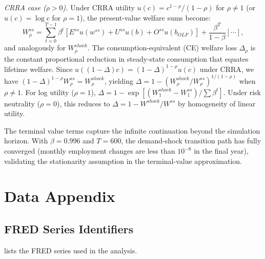 \documentclass[12pt]{article}
\begin{document}
\textit{CRRA case ($\rho > 0$).} Under CRRA utility $u(c) = c^{1-\rho}/(1-\rho)$ for $\rho \neq 1$ (or $u(c) = \log c$ for $\rho = 1$), the present-value welfare sums become:
\begin{equation*}
W^{ss}_\rho = \sum_{t=0}^{T-1} \beta^t \left[ E^{ss} u(w^{ss}) + U^{ss} u(b) + O^{ss} u(b_{OLF}) \right] + \frac{\beta^T}{1-\beta}[\cdots],
\end{equation*}
and analogously for $W^{shock}_\rho$. The consumption-equivalent (CE) welfare loss $\Delta_\rho$ is the constant proportional reduction in steady-state consumption that equates lifetime welfare. Since $u((1-\Delta)c) = (1-\Delta)^{1-\rho} u(c)$ under CRRA, we have $(1-\Delta)^{1-\rho} W^{ss}_\rho = W^{shock}_\rho$, yielding $\Delta = 1 - (W^{shock}_\rho / W^{ss}_\rho)^{1/(1-\rho)}$ when $\rho \neq 1$. For log utility ($\rho = 1$), $\Delta = 1 - \exp[(W^{shock}_1 - W^{ss}_1) / \sum \beta^t]$. Under risk neutrality ($\rho = 0$), this reduces to $\Delta = 1 - W^{shock}/W^{ss}$ by homogeneity of linear utility.

The terminal value terms capture the infinite continuation beyond the simulation horizon. With $\beta = 0.996$ and $T = 600$, the demand-shock transition path has fully converged (monthly employment changes are less than $10^{-8}$ in the final year), validating the stationarity assumption in the terminal-value approximation.


\section{Data Appendix}
\label{app:data}

\subsection{FRED Series Identifiers}

 lists the FRED series used in the analysis.
\end{document}
